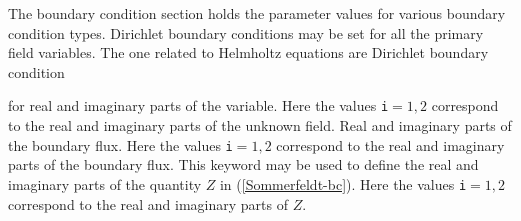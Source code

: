 The boundary condition section holds the parameter values for various
boundary condition types. Dirichlet boundary conditions may be
set for all the primary field variables. The one related to Helmholtz equations
are
\sifbegin
{} 
Dirichlet boundary condition

for real and imaginary parts of the variable.
Here the values {\tt i}$=1,2$ correspond to the real and 
imaginary parts of the unknown field.
Real and imaginary parts of the boundary flux.
Here the values {\tt i}$=1,2$ correspond to the real and 
imaginary parts of the boundary flux.
This keyword may be used to define the real and imaginary parts of
the quantity $Z$ in (\ref{Sommerfeldt-bc}).
Here the values {\tt i}$=1,2$ correspond to the real and 
imaginary parts of $Z$.
\sifend
\sifend


%
%
